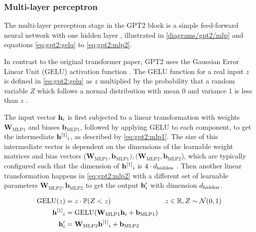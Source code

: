 \subsubsection{Multi-layer perceptron}
\label{gpt2:mlp}


The multi-layer perceptron stage in the GPT2 block is a simple feed-forward neural network with one hidden layer , illustrated in \cref{diagrams/gpt2/mlp} and equations \eqref{eq:gpt2:gelu} to \eqref{eq:gpt2:mlp2}.

In contrast to the original transformer paper, GPT2 uses the Gaussian Error Linear Unit (GELU) activation function .
The GELU function for a real input $z$ is defined in \cref{eq:gpt2:gelu} as $z$ multiplied by the probability that a random variable $Z$ which follows a normal distribution with mean 0 and variance 1 is less than $z$ \cite{gelu}.

The input vector ${\mathbf{h}}_i$ is first subjected to a linear transformation with weights $\mathbf{W}_\textrm{MLP1}$ and biases $\mathbf{b}_\textrm{MLP1}$, followed by applying GELU to each component, to get the intermediate ${{\mathbf{h}}^{[1]}}_i$, as described by \cref{eq:gpt2:mlp1}. The size of this intermediate vector is dependent on the dimensions of the learnable weight matrices and bias vectors ($\mathbf{W}_\textrm{MLP1}, \mathbf{b}_\textrm{MLP1}), (\mathbf{W}_\textrm{MLP2}, \mathbf{b}_\textrm{MLP2}$), which are typically configured such that the dimension of ${{\mathbf{h}}^{[1]}}_i$ is $4 \cdot {d_\textrm{hidden}}$  \cite[source code]{HuggingFaceGPT2}.
Then another linear transformation happens in \cref{eq:gpt2:mlp2} with a different set of learnable parameters $\mathbf{W}_\textrm{MLP2}, \mathbf{b}_\textrm{MLP2}$ to get the output ${\mathbf{h}}'_i$ with dimension ${d_\textrm{hidden}}$.

\begin{align}
	\mathrm{GELU}(z) &= z \cdot \mathbb{P}(Z<z) & z \in \mathbb{R}, Z \sim \mathcal{N}(0, 1)
	\label{eq:gpt2:gelu}
	\\
	{{\mathbf{h}}^{[1]}}_i &= \mathrm{GELU}(\mathbf{W}_\textrm{MLP1} {\mathbf{h}}_i + \mathbf{b}_\textrm{MLP1})
	\label{eq:gpt2:mlp1}
	\\
	{\mathbf{h}}'_i &= \mathbf{W}_\textrm{MLP2} {{\mathbf{h}}^{[1]}}_i + \mathbf{b}_\textrm{MLP2}
	\label{eq:gpt2:mlp2}
\end{align}

